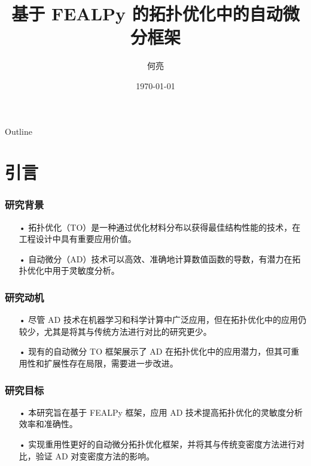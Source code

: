 \documentclass{beamer}
\title{基于 FEALPy 的拓扑优化中的自动微分框架}
\author{何亮}
\institute[XTU]{
学号：202331510117\\
\vspace{5pt}
湘潭大学$\bullet$数学与计算科学学院\\
}
\date[XTU]
{
    \today
}
\numberwithin{subsection}{section}
\begin{document}
\begin{frame}
  \titlepage
\end{frame}

\begin{frame}{Outline}
  \tableofcontents
\end{frame}

\section{引言}

\begin{frame}
\frametitle{研究背景}
    \begin{itemize}
	    \item[•]拓扑优化（TO）是一种通过优化材料分布以获得最佳结构性能的技术，在工程设计中具有重要应用价值。
	    \vspace{0.3cm}
	    \item[•]自动微分（AD）技术可以高效、准确地计算数值函数的导数，有潜力在拓扑优化中用于灵敏度分析。
    \end{itemize}
\end{frame}

\begin{frame}
\frametitle{研究动机}
    \begin{itemize}
	    \item[•]尽管 AD 技术在机器学习和科学计算中广泛应用，但在拓扑优化中的应用仍较少，尤其是将其与传统方法进行对比的研究更少。
	    \vspace{0.3cm}
	    \item[•]现有的自动微分 TO 框架展示了 AD 在拓扑优化中的应用潜力，但其可重用性和扩展性存在局限，需要进一步改进。
    \end{itemize}
\end{frame}

\begin{frame}
\frametitle{研究目标}
    \begin{itemize}
	    \item[•]本研究旨在基于 FEALPy 框架，应用 AD 技术提高拓扑优化的灵敏度分析效率和准确性。
	    \vspace{0.3cm}
	    \item[•]实现重用性更好的自动微分拓扑优化框架，并将其与传统变密度方法进行对比，验证 AD 对变密度方法的影响。
    \end{itemize}
\end{frame}
\end{document}
